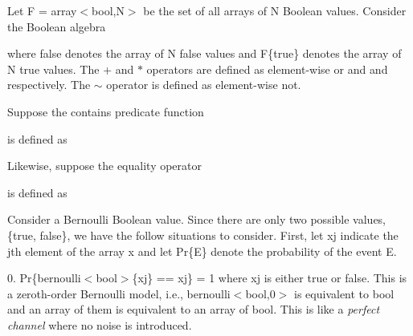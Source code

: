 Let {\ttfamily F = array$<$bool,N$>$} be the set of all arrays of {\ttfamily N} Boolean values. Consider the Boolean algebra 
\begin{DoxyCode}{0}

\end{DoxyCode}
 where {\ttfamily false} denotes the array of {\ttfamily N} {\ttfamily false} values and {\ttfamily F\{true\}} denotes the array of {\ttfamily N} {\ttfamily true} values. The {\ttfamily +} and {\ttfamily $\ast$} operators are defined as element-\/wise {\ttfamily or} and {\ttfamily and} respectively. The {\ttfamily $\sim$} operator is defined as element-\/wise {\ttfamily not}.

Suppose the {\ttfamily contains} predicate function 
\begin{DoxyCode}{0}

\end{DoxyCode}
 is defined as 
\begin{DoxyCode}{0}

\end{DoxyCode}
 Likewise, suppose the equality operator 
\begin{DoxyCode}{0}

\end{DoxyCode}
 is defined as 
\begin{DoxyCode}{0}
\DoxyCodeLine{\}}

\end{DoxyCode}


Consider a Bernoulli Boolean value. Since there are only two possible values, {\ttfamily \{true, false\}}, we have the follow situations to consider. First, let {\ttfamily xj} indicate the {\ttfamily j}th element of the array {\ttfamily x} and let {\ttfamily Pr\{E\}} denote the probability of the event {\ttfamily E}.

0. {\ttfamily Pr\{bernoulli$<$bool$>$\{xj\} == xj\} = 1} where {\ttfamily xj} is either {\ttfamily true} or {\ttfamily false}. This is a zeroth-\/order Bernoulli model, i.\+e., {\ttfamily bernoulli$<$bool,0$>$} is equivalent to {\ttfamily bool} and an array of them is equivalent to an array of {\ttfamily bool}. This is like a {\itshape perfect channel} where no noise is introduced.


